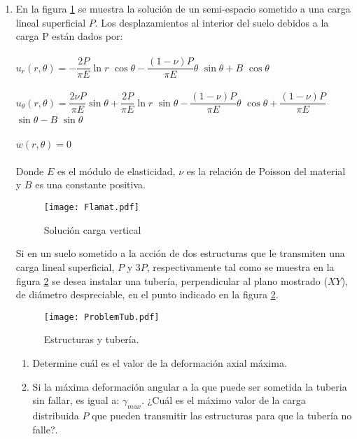\documentclass[../notas medios.tex]{subfiles}
\begin{document}
\begin{enumerate}
\item \label{punto07_d}  En la figura \cref{Solucion_Flamant} se  muestra la solución de un semi-espacio sometido a una carga lineal superficial $P$.  Los desplazamientos al interior del suelo debidos a la carga P est\'an dados por:  \\\\
%
	\hspace*{10mm} $ u_r (r,\theta) = -\dfrac{2P}{\pi{E}} \ln{r}$ ${\cos \theta} -\dfrac{(1 - \nu)P}{\pi{E}} {\theta}$ $ {\sin\theta} + B $ $ {\cos \theta} $ \\\\
	\hspace*{10mm} $ u_{\theta}(r,\theta) = \dfrac{2{\nu}P}{\pi{E}} \sin\theta + \dfrac{2P}{\pi{E}}\ln{r}$ $\sin\theta -\dfrac{(1 - \nu)P} {\pi{E}} 
	{\theta}$ $ {\cos\theta} + \dfrac{(1 - \nu)P}{\pi{E}}$ ${\sin\theta} - B$ $ {\sin\theta}$	\\\\
	\hspace*{10mm} $ w (r,\theta) = 0$ \\\\
%
\noindent Donde $E$ es el m\'odulo de elasticidad,  $\nu$ es la relaci\'on de Poisson del material y $B$ es una constante positiva.
%
\begin{figure}[H]
	\centering
		\texttt{[image: Flamat.pdf]} 
		\caption{Soluci\'on carga vertical}
		\label{Solucion_Flamant}
\end{figure}
%
Si en un suelo sometido a la acción de dos estructuras que le transmiten  una carga lineal superficial, $P$ y $3P$, respectivamente tal como se muestra en la figura  \cref{figure3} se desea instalar una tuber\'ia, perpendicular al plano mostrado ($XY$), de di\'ametro despreciable, en el punto indicado  en la figura \cref{figure3}.
%		
\begin{figure}[H]
	\centering
	\texttt{[image: ProblemTub.pdf]} 
	\caption{Estructuras y tuber\'ia.}
	\label{figure3}
\end{figure} 
\begin{enumerate}
%
	\item Determine cuál es el valor de la deformación axial máxima.
	\item  Si la m\'axima deformaci\'on angular a la que puede ser sometida la tuberia sin fallar, es igual a: $\gamma_{max}$. ¿Cu\'al es el m\'aximo valor de la carga distribuida $P$ que pueden transmitir las estructuras para que la tuber\'ia no falle?. 

\end{enumerate}
\end{enumerate}
\end{document}
